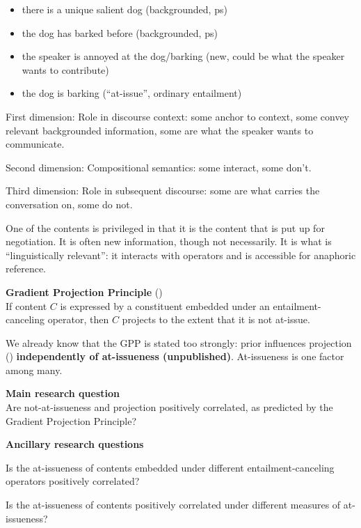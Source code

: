 \documentclass[11pt,fleqn]{article}
\newcommand{\6}{\mbox{$[\hspace*{-.6mm}[$}}
\newcommand{\9}{\mbox{$]\hspace*{-.6mm}]$}}
\begin{document}
\begin{itemize}
\item there is a unique salient dog (backgrounded, ps)
\item the dog has barked before (backgrounded, ps)
\item the speaker is annoyed at the dog/barking (new, could be what the speaker wants to contribute)
\item the dog is barking (``at-issue'', ordinary entailment)
\end{itemize}

First dimension: Role in discourse context: some anchor to context, some convey relevant backgrounded information, some are what the speaker wants to communicate.

Second dimension: Compositional semantics: some interact, some don't.

Third dimension: Role in subsequent discourse: some are what carries the conversation on, some do not.


One of the contents is privileged in that it is the content that is put up for negotiation. It is often new information, though not necessarily. It is what is ``linguistically relevant'': it interacts with operators and is accessible for anaphoric reference.


\begin{exe}
\ex\label{gpp} {\bf Gradient Projection Principle} \hfill (\citealt[400]{tbd-variability}) \\ If content $C$ is expressed by a constituent embedded under an entailment-canceling operator, then $C$ projects to the extent that it is not at-issue.
\end{exe}

We already know that the GPP is stated too strongly: prior influences projection (\citealt{degen-tonhauser-openmind}) {\bf independently of at-issueness (unpublished)}. At-issueness is one factor among many.


\begin{exe}
\ex\label{rqs} {\bf Main research question} \\
Are not-at-issueness and projection positively correlated, as predicted by the Gradient Projection Principle?
\end{exe}

\begin{exe}
\ex\label{rqs} {\bf Ancillary research questions}
\begin{xlist}

\ex Is the at-issueness of contents embedded under different entailment-canceling operators positively correlated?

\ex Is the at-issueness of contents positively correlated under different measures of at-issueness?
\end{xlist}
\end{exe}
\end{document}
